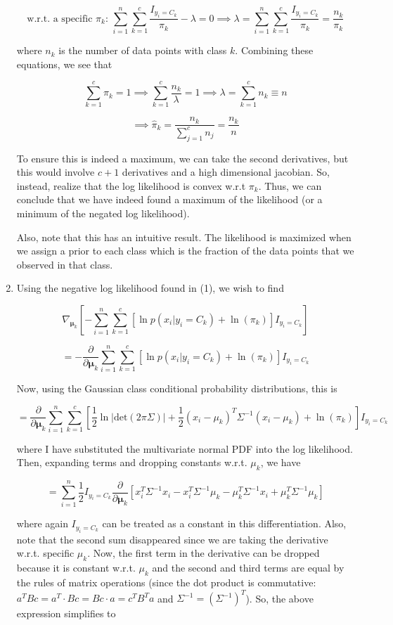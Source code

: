 \documentclass[submit]{harvardml}
\begin{document}
\begin{enumerate}
    $$ \textrm{w.r.t. a specific $\pi_k$: } \sum_{i=1}^n \sum_{k=1}^c \frac{I_{y_i=C_k}}{\pi_k} -\lambda = 0 \implies \lambda=\sum_{i=1}^n \sum_{k=1}^c \frac{I_{y_i=C_k}}{\pi_k} = \frac{n_k}{\pi_k} $$
    
    where $n_k$ is the number of data points with class $k$. Combining these equations, we see that
    
    $$ \sum_{k=1}^c \pi_k =1 \implies \sum_{k=1}^c \frac{n_k}{\lambda} =1 \implies \lambda = \sum_{k=1}^c n_k \equiv n$$
    
    $$ \implies \boxed{\hat{\pi}_k = \frac{n_k}{\sum_{j=1}^c n_j} = \frac{n_k}{n}}  $$
    
    To ensure this is indeed a maximum, we can take the second derivatives, but this would involve $c+1$ derivatives and a high dimensional jacobian. So, instead, realize that the log likelihood is convex w.r.t $\pi_k$. Thus, we can conclude that we have indeed found a maximum of the likelihood (or a minimum of the negated log likelihood).
    
    Also, note that this has an intuitive result. The likelihood is maximized when we assign a prior to each class which is the fraction of the data points that we observed in that class.
    
    \item Using the negative log likelihood found in (1), we wish to find
    
    $$ \nabla_{\mathbf{\mu}_k} [ -\sum_{i=1}^n \sum_{k=1}^c [ \ln p(x_i |y_i = C_k) +\ln(\pi_k)] I_{y_i=C_k} ]$$
    
    $$ = - \frac{\partial}{\partial \mathbf{\mu}_k}\sum_{i=1}^n \sum_{k=1}^c [ \ln p(x_i |y_i = C_k) +\ln(\pi_k)] I_{y_i=C_k} $$
    
    Now, using the Gaussian class conditional probability distributions, this is
    
    $$ = \frac{\partial}{\partial \mathbf{\mu}_k}\sum_{i=1}^n \sum_{k=1}^c [ \frac{1}{2}\ln|\textrm{det}(2\pi \Sigma)| + \frac{1}{2}(x_i-\mu_k)^T\Sigma^{-1}(x_i-\mu_k) +\ln(\pi_k)] I_{y_i=C_k} $$
    
    where I have substituted the multivariate normal PDF into the log likelihood. Then, expanding terms and dropping constants w.r.t. $\mu_k$, we have
    
    $$ = \sum_{i=1}^n \frac{1}{2}I_{y_i=C_k} \frac{\partial}{\partial \mathbf{\mu}_k}[x_i^T\Sigma^{-1}x_i -x_i^T\Sigma^{-1}\mu_k -\mu_k^T\Sigma^{-1}x_i  + \mu_k^T\Sigma^{-1}\mu_k]  $$
    
    where again $I_{y_i=C_k}$ can be treated as a constant in this differentiation. Also, note that the second sum disappeared since we are taking the derivative w.r.t. specific $\mu_k$. Now, the first term in the derivative can be dropped because it is constant w.r.t. $\mu_k$ and the second and third terms are equal by the rules of matrix operations (since the dot product is commutative: $a^TBc =a^T \cdot Bc = Bc \cdot a = c^TB^Ta $ and $\Sigma^{-1} = (\Sigma^{-1})^{T}$). So, the above expression simplifies to
    

\end{enumerate}
\end{document}
